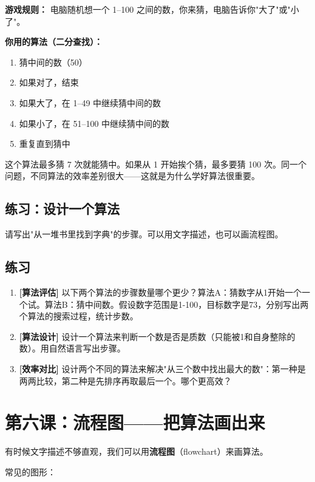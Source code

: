\documentclass[a4paper,12pt]{ctexart}
\begin{document}
\textbf{游戏规则：} 电脑随机想一个 1--100 之间的数，你来猜，电脑告诉你"大了"或"小了"。

\textbf{你用的算法（二分查找）：}
\begin{enumerate}
  \item 猜中间的数（50）
  \item 如果对了，结束
  \item 如果大了，在 1--49 中继续猜中间的数
  \item 如果小了，在 51--100 中继续猜中间的数
  \item 重复直到猜中
\end{enumerate}

这个算法最多猜 7 次就能猜中。如果从 1 开始挨个猜，最多要猜 100 次。同一个问题，不同算法的效率差别很大——这就是为什么学好算法很重要。

\subsection*{练习：设计一个算法}

请写出"从一堆书里找到字典"的步骤。可以用文字描述，也可以画流程图。

\subsection*{练习}

\begin{enumerate}
  \item \textbf{[算法评估]} 以下两个算法的步骤数量哪个更少？算法A：猜数字从1开始一个一个试。算法B：猜中间数。假设数字范围是1-100，目标数字是73，分别写出两个算法的搜索过程，统计步数。
  \item \textbf{[算法设计]} 设计一个算法来判断一个数是否是质数（只能被1和自身整除的数）。用自然语言写出步骤。
  \item \textbf{[效率对比]} 设计两个不同的算法来解决"从三个数中找出最大的数"：第一种是两两比较，第二种是先排序再取最后一个。哪个更高效？
\end{enumerate}

\section*{第六课：流程图——把算法画出来}

有时候文字描述不够直观，我们可以用\textbf{流程图}（flowchart）来画算法。

常见的图形：

\vspace{0.3cm}
\begin{center}
\end{center}
\end{document}
